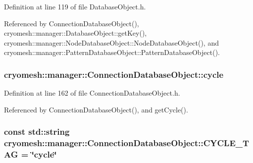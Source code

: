 \-Definition at line 119 of file \-Database\-Object.\-h.



\-Referenced by \-Connection\-Database\-Object(), cryomesh\-::manager\-::\-Database\-Object\-::get\-Key(), cryomesh\-::manager\-::\-Node\-Database\-Object\-::\-Node\-Database\-Object(), and cryomesh\-::manager\-::\-Pattern\-Database\-Object\-::\-Pattern\-Database\-Object().

\hypertarget{classcryomesh_1_1manager_1_1ConnectionDatabaseObject_a481ed7a285f11016e6f6182293cca49f}{
\subsubsection[{cycle}]{ {\bf cryomesh\-::manager\-::\-Connection\-Database\-Object\-::cycle}}}\label{classcryomesh_1_1manager_1_1ConnectionDatabaseObject_a481ed7a285f11016e6f6182293cca49f}


\-Definition at line 162 of file \-Connection\-Database\-Object.\-h.



\-Referenced by \-Connection\-Database\-Object(), and get\-Cycle().

\hypertarget{classcryomesh_1_1manager_1_1ConnectionDatabaseObject_a6af5ded40e1ecffc6dbe072b68a7a153}{
\subsubsection[{\-C\-Y\-C\-L\-E\-\_\-\-T\-A\-G}]{\setlength{\rightskip}{0pt plus 5cm}const std\-::string {\bf cryomesh\-::manager\-::\-Connection\-Database\-Object\-::\-C\-Y\-C\-L\-E\-\_\-\-T\-A\-G} = \char`\"{}cycle\char`\"{}}}\label{classcryomesh_1_1manager_1_1ConnectionDatabaseObject_a6af5ded40e1ecffc6dbe072b68a7a153}


